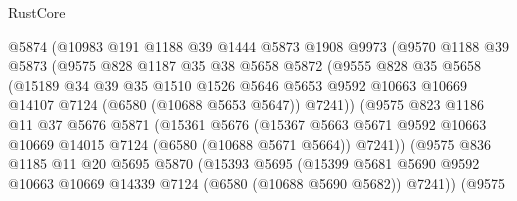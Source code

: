 \begin{lexlean}{RustCore}
\begin{coremodule}
                  @5874
                  (@10983
                    @191
                    @1188
                    @39
                    @1444
                    @5873
                    @1908
                    @9973
                    (@9570
                      @1188
                      @39
                      @5873
                      (@9575
                        @828
                        @1187
                        @35
                        @38
                        @5658
                        @5872
                        (@9555
                          @828
                          @35
                          @5658
                          (@15189
                            @34
                            @39
                            @35
                            @1510
                            @1526
                            @5646
                            @5653
                            @9592
                            @10663
                            @10669
                            @14107
                            @7124
                            (@6580 (@10688 @5653 @5647))
                            @7241))
                        (@9575
                          @823
                          @1186
                          @11
                          @37
                          @5676
                          @5871
                          (@15361
                            @5676
                            (@15367
                              @5663
                              @5671
                              @9592
                              @10663
                              @10669
                              @14015
                              @7124
                              (@6580 (@10688 @5671 @5664))
                              @7241))
                          (@9575
                            @836
                            @1185
                            @11
                            @20
                            @5695
                            @5870
                            (@15393
                              @5695
                              (@15399
                                @5681
                                @5690
                                @9592
                                @10663
                                @10669
                                @14339
                                @7124
                                (@6580 (@10688 @5690 @5682))
                                @7241))
                            (@9575

\end{coremodule}
\end{lexlean}
